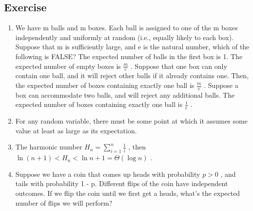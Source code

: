 \documentclass{article}
\begin{document}
\subsection{Exercise}
\begin{enumerate}
    \item We have m balls and m boxes. Each ball is assigned to one of the m boxes independently and uniformly at random (i.e., equally likely to each box). Suppose that m is sufficiently large, and e is the natural number, which of the following is FALSE?
    \subitem [A] The expected number of balls in the first box is 1.
    \subitem [B] The expected number of empty boxes is $\frac{m}{e}$ .
    \subitem [C] Suppose that one box can only contain one ball, and it will reject other balls if it already contains one. Then, the expected number of boxes containing exactly one ball is $\frac{m}{e}$ .
    \subitem [D] Suppose a box can accommodate two balls, and will reject any additional balls. The expected number of boxes containing exactly one ball is $\frac{1}{e}$ .
    \item For any random variable, there must be some point at which it assumes some value at least as large as its expectation.
    \item The harmonic number $H_n = \sum\limits_{i=1}^{n} \frac{1}{i}$ , then $\ln (n+1) < H_n < \ln n + 1 = \Theta (\log n)$ .
    \item Suppose we have a coin that comes up heads with probability $p > 0$ , and tails with probability 1 - p. Different flips of the coin have independent outcomes. If we flip the coin until we first get a heads, what's the expected number of flips we will perform?
\end{enumerate}
\end{document}
